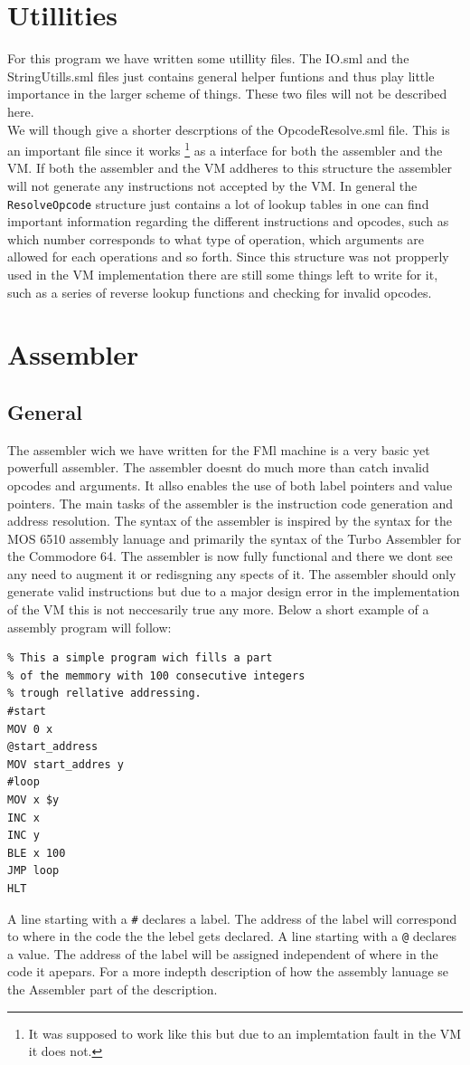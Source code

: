 \documentclass{article}
\newcommand{\V}{\verb}
\begin{document}
\section{Utillities}
For this program we have written some utillity files. The IO.sml and the
StringUtills.sml files just contains general helper funtions and thus play
little importance in the larger scheme of things. These two files will not be
described here.
\\
We will though give a shorter descrptions of the OpcodeResolve.sml file. This is
an important file since it works \footnote{It was supposed to work like this
but due to an implemtation fault in the VM it does not.} as a interface for both
the assembler and the VM. If both the assembler and the VM addheres to this
structure the assembler will not generate any instructions not accepted by the
VM. In general the \V+ResolveOpcode+ structure just contains a lot of lookup
tables in one can find important information regarding the different instructions 
and opcodes, such as which number corresponds to what type of operation, which 
arguments are allowed for each operations and so forth.
Since this structure was not propperly used in the VM implementation there are
still some things left to write for it, such as a series of reverse lookup
functions and checking for invalid opcodes.

\section{Assembler}
\subsection{General}
The assembler wich we have written for the FMl machine is a very basic yet
powerfull assembler. The assembler doesnt do much more than catch invalid
opcodes and arguments. It allso enables the use of both label pointers and value
pointers. The main tasks of the assembler is the instruction code generation and
address resolution. The syntax of the assembler is inspired by the syntax for
the MOS 6510 assembly lanuage and primarily the syntax of the Turbo Assembler
for the Commodore 64. The assembler is now fully functional and there we dont
see any need to augment it or redisgning any spects of it. The assembler should
only generate valid instructions but due to a major design error in the
implementation of the VM this is not neccesarily true any more. Below a short
example of a assembly program will follow:
\begin{verbatim}
% This a simple program wich fills a part 
% of the memmory with 100 consecutive integers
% trough rellative addressing.
#start
MOV 0 x
@start_address
MOV start_addres y
#loop
MOV x $y
INC x
INC y
BLE x 100
JMP loop
HLT
\end{verbatim}
A line starting with a \V+#+ declares a label. The address of the label will
correspond to where in the code the the lebel gets declared.
A line starting with a \V+@+ declares a value. The address of the label will be
assigned independent of where in the code it apepars.
For a more indepth description of how the assembly lanuage se the Assembler part
of the description.
\end{document}

